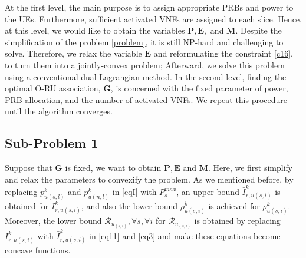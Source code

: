 \documentclass[lettersize,journal]{IEEEtran}
\begin{document}
At the first level, the main purpose is to assign appropriate PRBs and power to the UEs. Furthermore, sufficient activated VNFs are assigned to each slice. Hence, at this level, we would like to obtain the variables $\boldsymbol{P}, \boldsymbol{E},$ and $\boldsymbol{M}$.
Despite the simplification of the problem
\eqref{problem}, it is still NP-hard and challenging to solve. Therefore,
we relax the variable $\boldsymbol{E}$ \cite{lee2018dynamic,ali2018joint} and reformulating the constraint \eqref{c16},
to turn them into a jointly-convex problem; Afterward, we solve this problem using a conventional dual Lagrangian method.
In the second level, finding the optimal O-RU association, $ \boldsymbol{G}$, is concerned with the fixed parameter of power, PRB allocation, and the number of activated VNFs.
We repeat this procedure until the algorithm converges.

\subsection{Sub-Problem 1}\label{sub1}
Suppose that $\boldsymbol{G}$ is fixed, we want to obtain $\boldsymbol{P}, \boldsymbol{E}$ and $\boldsymbol{M}$.
Here, we first simplify and relax the parameters to convexify the problem.
As we mentioned before, by replacing $p_{u(s,l)}^{k}$ and $p_{u(n,l)}^{k}$ in \eqref{eqI} with $P^{max}_s$, an upper bound $\bar{I}_{r,u(s,i)}^{k}$ is obtained for $I_{r,u(s,i)}^{k}$, and also the lower bound $\bar{\rho}_{u(s,i)}^{k}$ is achieved
for $\rho_{u(s,i)}^{k}$.
Moreover, the lower bound $\bar{\mathcal{R}}_{u_{(s,i)}}, \forall s , \forall i$ for  ${\mathcal{R}}_{u_{(s,i)}}$ is obtained by replacing $I_{r,u(s,i)}^{k}$ with $\bar{I}_{r,u(s,i)}^{k}$ in \eqref{eq11} and \eqref{eq3} and make these equations become concave functions.
\end{document}
